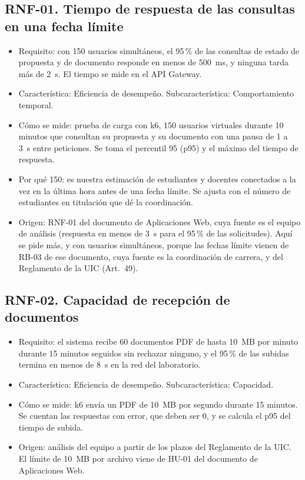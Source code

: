 \subsection*{RNF-01. Tiempo de respuesta de las consultas en una fecha límite}
\begin{itemize}
  \item Requisito: con 150 usuarios simultáneos, el 95\,\% de las consultas de estado de propuesta y de documento responde en menos de 500~ms, y ninguna tarda más de 2~s. El tiempo se mide en el API Gateway.
  \item Característica: Eficiencia de desempeño. Subcaracterística: Comportamiento temporal.
  \item Cómo se mide: prueba de carga con k6, 150 usuarios virtuales durante 10 minutos que consultan su propuesta y su documento con una pausa de 1 a 3~s entre peticiones. Se toma el percentil 95 (p95) y el máximo del tiempo de respuesta.
  \item Por qué 150: es nuestra estimación de estudiantes y docentes conectados a la vez en la última hora antes de una fecha límite. Se ajusta con el número de estudiantes en titulación que dé la coordinación.
  \item Origen: RNF-01 del documento de Aplicaciones Web, cuya fuente es el equipo de análisis (respuesta en menos de 3~s para el 95\,\% de las solicitudes). Aquí se pide más, y con usuarios simultáneos, porque las fechas límite vienen de RB-03 de ese documento, cuya fuente es la coordinación de carrera, y del Reglamento de la UIC (Art.~49).
\end{itemize}

\subsection*{RNF-02. Capacidad de recepción de documentos}
\begin{itemize}
  \item Requisito: el sistema recibe 60 documentos PDF de hasta 10~MB por minuto durante 15 minutos seguidos sin rechazar ninguno, y el 95\,\% de las subidas termina en menos de 8~s en la red del laboratorio.
  \item Característica: Eficiencia de desempeño. Subcaracterística: Capacidad.
  \item Cómo se mide: k6 envía un PDF de 10~MB por segundo durante 15 minutos. Se cuentan las respuestas con error, que deben ser 0, y se calcula el p95 del tiempo de subida.
  \item Origen: análisis del equipo a partir de los plazos del Reglamento de la UIC. El límite de 10~MB por archivo viene de HU-01 del documento de Aplicaciones Web.
\end{itemize}

